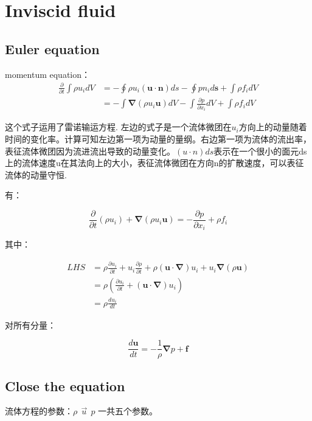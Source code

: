 \documentclass[fontset=windows]{report}
\begin{document}
\chapter{Inviscid fluid}
\section{Euler equation}

momentum equation：
\begin{equation}
  \begin{aligned}
    \frac{\partial}{\partial t}\int \rho u_i dV
    &=-\oint\rho u_i(\boldsymbol u \cdot\boldsymbol n)ds
    -\oint pn_id\boldsymbol s +\int \rho f_idV\\
    &=-\int \boldsymbol \nabla (\rho u_i\boldsymbol u)dV-
    \int \frac{\partial p}{\partial x_i}dV+\int\rho f_i dV
    \end{aligned}
\end{equation}


这个式子运用了雷诺输运方程.
左边的式子是一个流体微团在\(u_i\)方向上的动量随着时间的变化率。计算可知左边第一项为动量的量纲。右边第一项为流体的流出率，表征流体微团因为流进流出导致的动量变化。\((u\cdot n)ds\)表示在一个很小的面元ds上的流体速度u在其法向上的大小，表征流体微团在方向n的扩散速度，可以表征流体的动量守恒.

有：

\[\frac{\partial}{\partial t}(\rho u_i)+\boldsymbol\nabla (\rho u_i \boldsymbol u)=-\frac{\partial p}{\partial x_i}+\rho f_i\]

其中：

\begin{align*}
LHS
&=\rho\frac{\partial u_i}{\partial t}+u_i\frac{\partial \rho}{\partial t}+\rho(\boldsymbol{u\cdot\nabla})u_i+u_i \boldsymbol\nabla(\rho \boldsymbol u)\\
&=\rho\left(\frac{\partial u_i}{\partial t}+(\boldsymbol{u\cdot\nabla})u_i\right)\\
&=\rho\frac{du_i}{dt}
\end{align*}

对所有分量：

\[\frac{d\boldsymbol u}{dt}=-\frac{1}{\rho}\boldsymbol\nabla p+\boldsymbol f\]

\section{Close the equation}

流体方程的参数：\(\rho\ \ \vec u \ \ p\) 一共五个参数。
\end{document}
